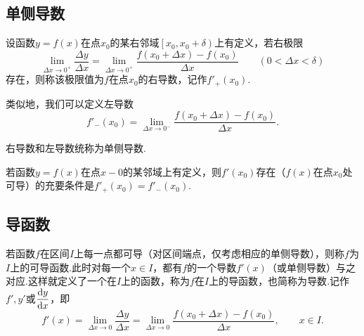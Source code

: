 \subsection{单侧导数}
\begin{definition}[单侧导数]
	设函数$y=f(x)$在点$x_0$的某右邻域$\left[x_0,x_0+\delta\right)$上有定义，若右极限
	$$\lim\limits_{\Delta x\to 0^+}\frac{\Delta y}{\Delta x}=\lim\limits_{\Delta x\to 0^+}\frac{f(x_0+\Delta x)-f(x_0)}{\Delta x}\qquad(0<\Delta x<\delta)$$
	存在，则称该极限值为$f$在点$x_0$的{\heiti 右导数}，记作$f'_+(x_0)$.
	
	类似地，我们可以定义左导数
	$$f'_-(x_0)=\lim\limits_{\Delta x\to 0^-}\frac{f(x_0+\Delta x)-f(x_0)}{\Delta x}.$$
	
	右导数和左导数统称为{\heiti 单侧导数}.
\end{definition}
\begin{theorem}
	若函数$y=f(x)$在点$x-0$的某邻域上有定义，则$f'(x_0)$存在（$f(x)$在点$x_0$处可导）的充要条件是$f'_+(x_0)=f'_-(x_0).$
\end{theorem}
\subsection{导函数}
\begin{definition}[导函数]
	若函数$f$在区间$I$上每一点都可导（对区间端点，仅考虑相应的单侧导数），则称$f$为$I$上的可导函数.此时对每一个$x\in I$，都有$f$的一个导数$f'(x)$（或单侧导数）与之对应.这样就定义了一个在$I$上的函数，称为$f$在$I$上的{\heiti 导函数}，也简称为{\heiti 导数}.记作$f',y'$或$\dfrac{\odif{y}}{\odif{x}}$，即
	$$f'(x)=\lim\limits_{\Delta x\to 0}\frac{\Delta y}{\Delta x}=\lim\limits_{\Delta x\to 0}\frac{f(x_0+\Delta x)-f(x_0)}{\Delta x},\qquad x\in I.$$
\end{definition}
